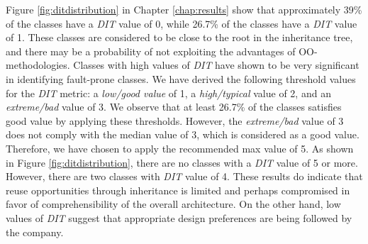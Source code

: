 Figure \ref{fig:ditdistribution} in Chapter \ref{chap:results} show that approximately 39\% of the classes have a \textit{DIT} value of 0, while 26.7\% of the classes have a \textit{DIT} value of 1. These classes are considered to be close to the root in the inheritance tree, and there may be a probability of not exploiting the advantages of OO-methodologies. Classes with high values of \textit{DIT} have shown to be very significant in identifying fault-prone classes\cite{basili1996validation,el2001prediction}. We have derived the following threshold values for the \textit{DIT} metric: a \textit{low/good value} of 1, a \textit{high/typical} value of 2, and an \textit{extreme/bad} value of 3. We observe that at least 26.7\% of the classes satisfies good value by applying these thresholds. However, the \textit{extreme/bad} value of 3 does not comply with the median value of 3, which is considered as a good value\cite{chidamber1994metrics}. Therefore, we have chosen to apply the recommended max value of 5. As shown in Figure \ref{fig:ditdistribution}, there are no classes with a \textit{DIT} value of 5 or more. However, there are two classes with \textit{DIT} value of 4. These results do indicate that reuse opportunities through inheritance is limited and perhaps compromised in favor of comprehensibility of the overall architecture. On the other hand, low values of \textit{DIT} suggest that appropriate design preferences are being followed by the company\cite{subramanyam2003empirical}.

